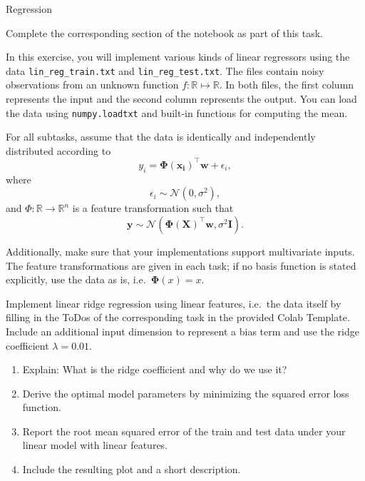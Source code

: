 \documentclass[
	english,
        solution=true
	]{tudaexercise}
\begin{document}
\begin{task}[points=34]{Regression}
    \begin{programmingtaskbox}
        Complete the corresponding section of the notebook as part of this task.
    \end{programmingtaskbox}

    In this exercise, you will implement various kinds of linear regressors using the data \texttt{lin\_reg\_train.txt} and \texttt{lin\_reg\_test.txt}.
    The files contain noisy observations from an unknown function $f: \mathbb{R} \mapsto \mathbb{R}$.
    In both files, the first column represents the input and the second column represents the output.
    You can load the data using \texttt{numpy.loadtxt} and built-in functions for computing the mean.

    For all subtasks, assume that the data is identically and independently distributed according to
    \begin{equation*}
        y_i = \bm{\Phi}(\mathbf{x_i})^\top \mathbf{w} + \epsilon_i,
    \end{equation*}
    where
    \begin{equation*}
        \epsilon_i \sim \mathcal{N}(0, \sigma^2),
    \end{equation*}
    and $\Phi: \mathbb{R} \rightarrow \mathbb{R}^n$ is a feature transformation such that
    \begin{equation*}
        \mathbf{y} \sim \mathcal{N}(\bm{\Phi}(\mathbf{X})^\top \mathbf{w}, \sigma^2 \mathbf{I}).
    \end{equation*}

    Additionally, make sure that your implementations support multivariate inputs. The feature transformations
    are given in each task; if no basis function is stated explicitly, use the data as is, i.e.~$\bm{\Phi}(x) = x$.

    \begin{subtask}[points=8, title=Linear Features]
        Implement linear ridge regression using linear features, i.e.~the data itself by filling in the ToDos of the corresponding task in the provided Colab Template.
        Include an additional input dimension to represent a bias term and use the ridge coefficient $\lambda = 0.01$.
        
        \begin{enumerate}
            \item Explain: What is the ridge coefficient and why do we use it? 
            \item Derive the optimal model parameters by minimizing the squared error loss function. 
            \item Report the root mean squared error of the train and test data under your linear model with linear features. 
            \item Include the resulting plot and a short description. 
        \end{enumerate}


\end{subtask}
\end{task}
\end{document}
